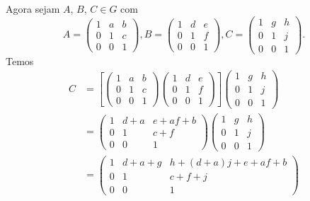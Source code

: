 \documentclass[12pt]{exam}
\begin{document}
    Agora sejam $A$, $B$, $C \in G$ com
    \[
        A = \begin{pmatrix} 1 & a & b\\0 & 1 & c\\0 & 0 & 1\end{pmatrix},
        B = \begin{pmatrix} 1 & d & e\\0 & 1 & f\\0 & 0 & 1\end{pmatrix},
        C = \begin{pmatrix} 1 & g & h\\0 & 1 & j\\0 & 0 & 1\end{pmatrix}.
    \]
    Temos
    \begin{align*}
        [AB]C &= \left[\begin{pmatrix} 1 & a & b\\0 & 1 & c\\0 & 0 & 1\end{pmatrix}\begin{pmatrix} 1 & d & e\\0 & 1 & f\\0 & 0 & 1\end{pmatrix}\right]\begin{pmatrix} 1 & g & h\\0 & 1 & j\\0 & 0 & 1\end{pmatrix} \\ &= \begin{pmatrix} 1 & d + a & e + af + b\\0 & 1 & c + f\\0 & 0 & 1\end{pmatrix}\begin{pmatrix} 1 & g & h\\0 & 1 & j\\0 & 0 & 1\end{pmatrix} \\ &= \begin{pmatrix} 1 & d + a + g & h + (d + a)j + e + af + b\\0 & 1 & c + f + j\\0 & 0 & 1\end{pmatrix}\\

\end{align*}
\end{document}
